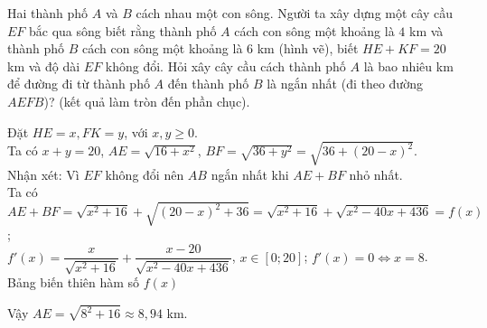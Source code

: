 \begin{bt}%
Hai thành phố $A$ và $B$ cách nhau một con sông. Người ta xây dựng một cây cầu $EF$ bắc qua sông biết rằng thành phố $A$ cách con sông một khoảng là $4$ km và thành phố $B$ cách con sông một khoảng là $6$ km (hình vẽ), biết $HE+K F=20$ km và độ dài $E F$ không đổi. Hỏi xây cây cầu cách thành phố $A$ là bao nhiêu km để đường đi từ thành phố $A$ đến thành phố $B$ là ngắn nhất (đi theo đường $A E F B$)? (kết quả làm tròn đến phần chục).
\begin{center}
\end{center}
\loigiai
{
Đặt $H E=x, F K=y$, với $x, y \geq  0$.\\
Ta có $x+y=20$, $AE=\sqrt{16+x^2}$, $B F=\sqrt{36+y^2}=\sqrt{36+(20-x)^2}$. \\
Nhận xét: Vì $EF$ không đổi nên $AB$ ngắn nhất khi $A E+B F$ nhỏ nhất. \\
Ta có $A E+B F=\sqrt{x^2+16}+\sqrt{(20-x)^2+36}=\sqrt{x^2+16}+\sqrt{x^2-40 x+436}=f(x)$;\\
$f'(x)=\dfrac{x}{\sqrt{x^2+16}}+\dfrac{x-20}{\sqrt{x^2-40 x+436}}$, $x \in [0 ; 20]$; 
$f'(x)=0 \Leftrightarrow  x=8$. \\
Bảng biến thiên hàm số $f(x)$
\begin{center}
\end{center}
Vậy $A E=\sqrt{8^2+16} \approx 8{,}94$ km.
}
\end{bt}

